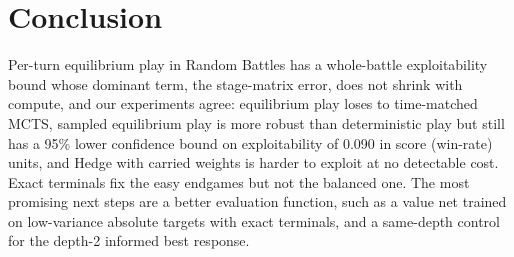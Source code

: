 \documentclass[10pt]{article}
\theoremstyle{plain}
\theoremstyle{definition}
\theoremstyle{remark}
\begin{document}
\section{Conclusion}
\label{sec:conclusion}
Per-turn equilibrium play in Random Battles has a whole-battle exploitability bound whose dominant term, the stage-matrix error, does not shrink with compute, and our experiments agree: equilibrium play loses to time-matched MCTS, sampled equilibrium play is more robust than deterministic play but still has a 95\% lower confidence bound on exploitability of 0.090 in score (win-rate) units, and Hedge with carried weights is harder to exploit at no detectable cost. Exact terminals fix the easy endgames but not the balanced one. The most promising next steps are a better evaluation function, such as a value net trained on low-variance absolute targets with exact terminals, and a same-depth control for the depth-2 informed best response.
\end{document}
